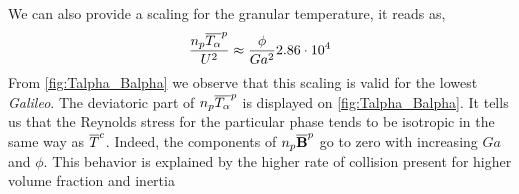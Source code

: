 We can also provide a scaling for the granular temperature, it reads as,  
\begin{equation}
    \frac{n_p\overline{T_\alpha}^{p}}{U^2}  \approx \frac{\phi}{Ga^2} 2.86\cdot10^{4} 
    \label{eq:Talpha_scaling}
\end{equation}
From \ref{fig:Talpha_Balpha} we observe that this scaling is valid for the lowest \textit{Galileo}. 
The deviatoric part of $n_p\overline{T_\alpha}^{p}$ is displayed on \ref{fig:Talpha_Balpha}.
It tells us that the Reynolds stress for the particular phase tends to be isotropic in the same way as $\overline{T}^c$. 
Indeed, the components of $n_p\overline{\textbf{B}}^{p}$ go to zero with increasing $Ga$ and $\phi$. 
This behavior is explained by the higher rate of collision present for higher volume fraction and inertia \citep[chapter 1]{jackson2000dynamics}